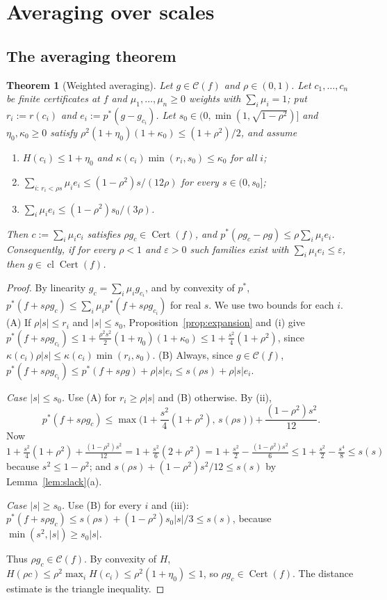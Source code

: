 \documentclass[10pt]{amsart}
\newtheorem{theorem}{Theorem}[section]
\theoremstyle{definition}
\theoremstyle{remark}
\newcommand{\Cset}{\mathcal C}
\newcommand{\Cert}{\operatorname{Cert}}
\newcommand{\cl}{\operatorname{cl}}
\begin{document}
\section{Averaging over scales}\label{sec:averaging}

\subsection{The averaging theorem}

\begin{theorem}[Weighted averaging]\label{thm:averaging}
Let $g\in\Cset(f)$ and $\rho\in(0,1)$.  Let $c_1,\dots,c_n$ be finite
certificates at $f$ and $\mu_1,\dots,\mu_n\ge0$ weights with
$\sum_i\mu_i=1$; put $r_i:=r(c_i)$ and $e_i:=p^*(g-g_{c_i})$.  Let
$s_0\in(0,\min(1,\sqrt{1-\rho^2})]$ and $\eta_0,\kappa_0\ge0$ satisfy
$\rho^2(1+\eta_0)(1+\kappa_0)\le(1+\rho^2)/2$, and assume
\begin{enumerate}
\item[(i)] $H(c_i)\le1+\eta_0$ and $\kappa(c_i)\min(r_i,s_0)\le\kappa_0$
for all $i$;
\item[(ii)] $\sum_{i:\,r_i<\rho s}\mu_ie_i\le(1-\rho^2)s/(12\rho)$ for every
$s\in(0,s_0]$;
\item[(iii)] $\sum_i\mu_ie_i\le(1-\rho^2)s_0/(3\rho)$.
\end{enumerate}
Then $c:=\sum_i\mu_ic_i$ satisfies $\rho g_c\in\Cert(f)$, and
$p^*(\rho g_c-\rho g)\le\rho\sum_i\mu_ie_i$.  Consequently, if for every
$\rho<1$ and $\varepsilon>0$ such families exist with
$\sum_i\mu_ie_i\le\varepsilon$, then $g\in\cl\Cert(f)$.
\end{theorem}

\begin{proof}
By linearity $g_c=\sum_i\mu_ig_{c_i}$, and by convexity of $p^*$,
$p^*(f+s\rho g_c)\le\sum_i\mu_ip^*(f+s\rho g_{c_i})$ for real $s$.  We
use two bounds for each $i$.  (A) If $\rho|s|\le r_i$ and $|s|\le s_0$,
Proposition~\ref{prop:expansion} and (i) give
$p^*(f+s\rho g_{c_i})\le1+\frac{\rho^2s^2}2(1+\eta_0)(1+\kappa_0)\le
1+\frac{s^2}4(1+\rho^2)$, since $\kappa(c_i)\rho|s|\le\kappa(c_i)
\min(r_i,s_0)$.  (B) Always, since $g\in\Cset(f)$,
$p^*(f+s\rho g_{c_i})\le p^*(f+s\rho g)+\rho|s|e_i\le s(\rho s)+\rho|s|e_i$.

\emph{Case $|s|\le s_0$.}  Use (A) for $r_i\ge\rho|s|$ and (B) otherwise.
By (ii),
\[
 p^*(f+s\rho g_c)\le\max\Big(1+\frac{s^2}4(1+\rho^2),\,s(\rho s)\Big)
 +\frac{(1-\rho^2)s^2}{12}.
\]
Now $1+\frac{s^2}4(1+\rho^2)+\frac{(1-\rho^2)s^2}{12}=1+\frac{s^2}{6}
(2+\rho^2)=1+\frac{s^2}2-\frac{(1-\rho^2)s^2}6\le1+\frac{s^2}2-\frac{s^4}8
\le s(s)$ because $s^2\le1-\rho^2$; and $s(\rho s)+(1-\rho^2)s^2/12\le s(s)$
by Lemma~\ref{lem:slack}(a).

\emph{Case $|s|\ge s_0$.}  Use (B) for every $i$ and (iii):
$p^*(f+s\rho g_c)\le s(\rho s)+(1-\rho^2)s_0|s|/3\le s(s)$, because
$\min(s^2,|s|)\ge s_0|s|$.

Thus $\rho g_c\in\Cset(f)$.  By convexity of $H$,
$H(\rho c)\le\rho^2\max_iH(c_i)\le\rho^2(1+\eta_0)\le1$, so $\rho
g_c\in\Cert(f)$.  The distance estimate is the triangle inequality.
\end{proof}
\end{document}
